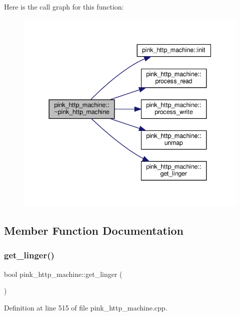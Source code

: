 Here is the call graph for this function\+:
\nopagebreak
\begin{figure}[H]
\begin{center}
\leavevmode
\includegraphics[width=337pt]{classpink__http__machine_a38d1d6228955fc97c752d330d4c126c2_cgraph}
\end{center}
\end{figure}


\subsection{Member Function Documentation}
\mbox{\label{classpink__http__machine_a01dcf59a537c21d5a4a92c1c25fbf3ab}} 
\subsubsection{\texorpdfstring{get\+\_\+linger()}{get\_linger()}}
{\footnotesize\ttfamily bool pink\+\_\+http\+\_\+machine\+::get\+\_\+linger (\begin{DoxyParamCaption}{ }\end{DoxyParamCaption})}



Definition at line 515 of file pink\+\_\+http\+\_\+machine.\+cpp.

